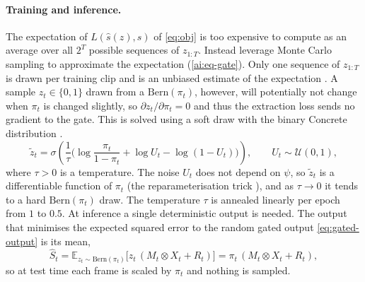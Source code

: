 \paragraph{Training and inference.} The expectation of $L(\hat{s}(z), s)$ of \eqref{eq:obj} is too expensive to compute as an average over all $2^T$ possible sequences of $z_{1:T}$. Instead leverage Monte Carlo sampling to approximate the expectation (\ref{ai:eq-gate}). Only one sequence of $z_{1:T}$ is drawn per training clip and is an unbiased estimate of the expectation \cite{kingma2014autoencoding}. A sample $z_t \in \{0, 1\}$ drawn from a $\mathrm{Bern}(\pi_t)$, however, will potentially not change when $\pi_t$ is changed slightly, so $\partial z_t / \partial \pi_t = 0$ and thus the extraction loss sends no gradient to the gate. This is solved using a soft draw with the binary Concrete distribution \cite{maddison2017concrete, jang2017categorical}. 
 \begin{equation}
    \tilde{z}_t = \sigma\!\left(\frac{1}{\tau}\Big(\log\frac{\pi_t}{1-\pi_t} + \log U_t - \log(1-U_t)\Big)\right), \qquad U_t \sim
  \mathcal{U}(0,1),
    \label{eq:concrete}
  \end{equation}
  where $\tau > 0$ is a temperature. The noise $U_t$ does not depend on $\psi$, so $\tilde{z}_t$ is a differentiable function of $\pi_t$ (the reparameterisation trick \cite{kingma2014autoencoding}), and as $\tau \to 0$ it tends to a hard $\mathrm{Bern}(\pi_t)$ draw. The temperature $\tau$ is annealed linearly per epoch from $1$ to $0.5$. At inference a single deterministic output is needed. The output that minimises the expected squared error to the random gated output \eqref{eq:gated-output} is its mean,
  \begin{equation}
    \hat{S}_t = \mathbb{E}_{z_t \sim \mathrm{Bern}(\pi_t)}\big[z_t\,(M_t \otimes X_t + R_t)\big] = \pi_t\,(M_t \otimes X_t + R_t),
    \label{eq:gate-inference}
  \end{equation}
  so at test time each frame is scaled by $\pi_t$ and nothing is sampled.